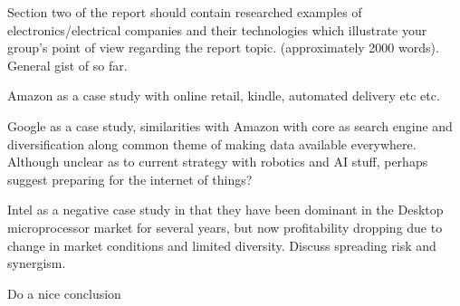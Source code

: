 

Section two of the report should contain researched examples of electronics/electrical companies and their technologies which illustrate your group’s point of view regarding the report topic.   (approximately 2000 words).
General gist of so far.

Amazon as a case study with online retail, kindle, automated delivery etc etc.



Google as a case study, similarities with Amazon with core as search engine and diversification along common theme of making data available everywhere. Although unclear as to current strategy with robotics and AI stuff, perhaps suggest preparing for the internet of things?



Intel as a negative case study in that they have been dominant in the Desktop microprocessor market for several years, but now profitability dropping due to change in market conditions and limited diversity. Discuss spreading risk and synergism.

Do a nice conclusion



